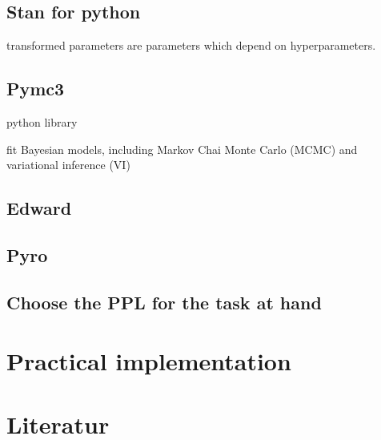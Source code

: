 \documentclass{article}
\begin{document}
\subsection{Stan for python}

transformed parameters are parameters which depend on hyperparameters.

\subsection{Pymc3}

python library

fit Bayesian models, including Markov Chai Monte Carlo (MCMC) and variational inference (VI)


\subsection{Edward}

\subsection{Pyro}

\subsection{Choose the PPL for the task at hand}

\section{Practical implementation}

\listoffigures
        
\section{Literatur}



\end{document}
